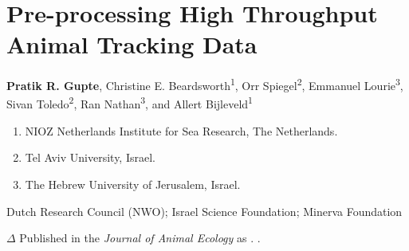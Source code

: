 \chapter{Pre-processing High Throughput Animal Tracking Data}\label{ch:preprocessing}
% 
{\noindent \textbf{Pratik R. Gupte}, Christine E. Beardsworth\textsuperscript{1}, Orr Spiegel\textsuperscript{2}, Emmanuel Lourie\textsuperscript{3}, Sivan Toledo\textsuperscript{2}, Ran Nathan\textsuperscript{3}, and Allert Bijleveld\textsuperscript{1}}

    \medskip

    {\color{Maroon}\normalsize{}}

    \begin{enumerate}
        \item NIOZ Netherlands Institute for Sea Research, The Netherlands.
        \item Tel Aviv University, Israel.
        \item The Hebrew University of Jerusalem, Israel.
    \end{enumerate}

    \medskip

    {\color{Maroon}\normalsize{}}

    Dutch Research Council (NWO); Israel Science Foundation; Minerva Foundation

    \bigskip

    {\noindent \large{$\Delta$}} \normalfont Published in the \textit{Journal of Animal Ecology} as \citet{gupte2022d}. .

\clearpage
